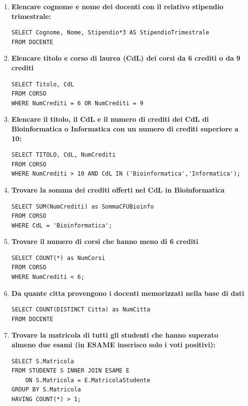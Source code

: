 \documentclass{article}
\begin{document}
\begin{enumerate}
	\item \textbf{Elencare cognome e nome dei docenti con il relativo stipendio trimestrale:}
\begin{lstlisting}[style=sqlstyle]
SELECT Cognome, Nome, Stipendio*3 AS StipendioTrimestrale
FROM DOCENTE
\end{lstlisting}

\item \textbf{Elencare titolo e corso di laurea (CdL) dei corsi da 6 crediti o da 9 crediti}
\begin{lstlisting}[style=sqlstyle]
SELECT Titolo, CdL
FROM CORSO
WHERE NumCrediti = 6 OR NumCrediti = 9
\end{lstlisting}

\item \textbf{Elencare il titolo, il CdL e il numero di crediti dei CdL di Bioinformatica o Informatica con un numero di crediti superiore a 10:}
\begin{lstlisting}[style=sqlstyle]
SELECT TITOLO, CdL, NumCrediti
FROM CORSO
WHERE NumCrediti > 10 AND CdL IN ('Bioinformatica','Informatica');
\end{lstlisting}

\item \textbf{Trovare la somma dei crediti offerti nel CdL in Bioinformatica}
\begin{lstlisting}[style=sqlstyle]
SELECT SUM(NumCrediti) as SommaCFUBioinfo
FROM CORSO
WHERE CdL = 'Bioinformatica';
\end{lstlisting}

\item \textbf{Trovare il numero di corsi che hanno meno di 6 crediti}
\begin{lstlisting}[style=sqlstyle]
SELECT COUNT(*) as NumCorsi
FROM CORSO
WHERE NumCrediti < 6;
\end{lstlisting}

\item \textbf{Da quante citta provengono i docenti memorizzati nella base di dati}
\begin{lstlisting}[style=sqlstyle]
SELECT COUNT(DISTINCT Citta) as NumCitta
FROM DOCENTE
\end{lstlisting}

\item \textbf{Trovare la matricola di tutti gli studenti che hanno superato almeno due esami (in ESAME inserisco solo i voti positivi):}
\begin{lstlisting}[style=sqlstyle]
SELECT S.Matricola
FROM STUDENTE S INNER JOIN ESAME E 
	ON S.Matricola = E.MatricolaStudente
GROUP BY S.Matricola
HAVING COUNT(*) > 1;
\end{lstlisting}


\end{enumerate}
\end{document}

